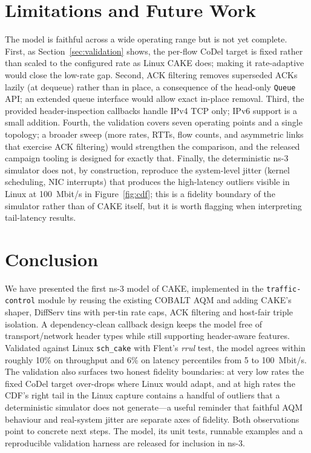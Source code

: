 \documentclass[sigconf,nonacm]{acmart}
\begin{document}
\section{Limitations and Future Work}
\label{sec:future}

The model is faithful across a wide operating range but is not yet complete.
First, as Section~\ref{sec:validation} shows, the per-flow CoDel target is fixed
rather than scaled to the configured rate as Linux CAKE does; making it
rate-adaptive would close the low-rate gap. Second, ACK filtering removes
superseded ACKs lazily (at dequeue) rather than in place, a consequence of the
head-only \texttt{Queue} API; an extended queue interface would allow exact
in-place removal. Third, the provided header-inspection callbacks handle IPv4
TCP only; IPv6 support is a small addition. Fourth, the validation covers seven
operating points and a single topology; a broader sweep (more rates, RTTs,
flow counts, and asymmetric links that exercise ACK filtering) would strengthen
the comparison, and the released campaign tooling is designed for exactly that.
Finally, the deterministic ns-3 simulator does not, by construction, reproduce
the system-level jitter (kernel scheduling, NIC interrupts) that produces the
high-latency outliers visible in Linux at 100~Mbit/s in Figure~\ref{fig:cdf};
this is a fidelity boundary of the simulator rather than of CAKE itself, but it
is worth flagging when interpreting tail-latency results.

\section{Conclusion}
\label{sec:conclusion}

We have presented the first ns-3 model of CAKE, implemented in the
\texttt{traffic-control} module by reusing the existing COBALT AQM and adding
CAKE's shaper, DiffServ tins with per-tin rate caps, ACK filtering and host-fair
triple isolation. A dependency-clean callback design keeps the model free of
transport/network header types while still supporting header-aware features.
Validated against Linux \texttt{sch\_cake} with Flent's \emph{rrul} test, the
model agrees within roughly 10\% on throughput and 6\% on latency percentiles
from 5 to 100~Mbit/s. The validation also surfaces two honest fidelity
boundaries: at very low rates the fixed CoDel target over-drops where Linux
would adapt, and at high rates the CDF's right tail in the Linux capture
contains a handful of outliers that a deterministic simulator does not
generate---a useful reminder that faithful AQM behaviour and real-system
jitter are separate axes of fidelity. Both observations point to concrete next
steps. The model, its unit tests, runnable examples and a reproducible
validation harness are released for inclusion in ns-3.



\end{document}
